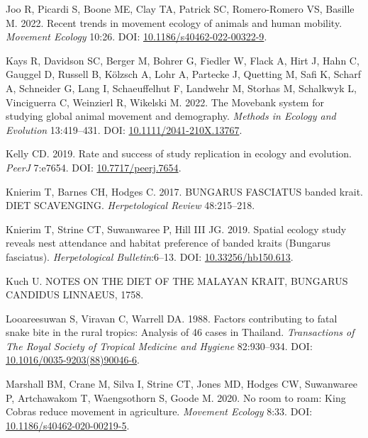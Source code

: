 \documentclass[10pt,a4paper]{article}
\newlength{\cslhangindent}
\newenvironment{CSLReferences}[2] %
 {\begin{list}{}{%
  \setlength{\itemindent}{0pt}
  \setlength{\leftmargin}{0pt}
  \setlength{\parsep}{0pt}
  \ifodd #1
   \setlength{\leftmargin}{\cslhangindent}
   \setlength{\itemindent}{-1\cslhangindent}
  \fi
  \setlength{\itemsep}{#2\baselineskip}}}
 {\end{list}}
\begin{document}
\begin{CSLReferences}{1}{0}
Joo R, Picardi S, Boone ME, Clay TA, Patrick SC, Romero-Romero VS, Basille M. 2022. Recent trends in movement ecology of animals and human mobility. \emph{Movement Ecology} 10:26. DOI: \href{https://doi.org/10.1186/s40462-022-00322-9}{10.1186/s40462-022-00322-9}.

Kays R, Davidson SC, Berger M, Bohrer G, Fiedler W, Flack A, Hirt J, Hahn C, Gauggel D, Russell B, Kölzsch A, Lohr A, Partecke J, Quetting M, Safi K, Scharf A, Schneider G, Lang I, Schaeuffelhut F, Landwehr M, Storhas M, Schalkwyk L, Vinciguerra C, Weinzierl R, Wikelski M. 2022. The {Movebank} system for studying global animal movement and demography. \emph{Methods in Ecology and Evolution} 13:419--431. DOI: \href{https://doi.org/10.1111/2041-210X.13767}{10.1111/2041-210X.13767}.

Kelly CD. 2019. Rate and success of study replication in ecology and evolution. \emph{PeerJ} 7:e7654. DOI: \href{https://doi.org/10.7717/peerj.7654}{10.7717/peerj.7654}.

Knierim T, Barnes CH, Hodges C. 2017. BUNGARUS FASCIATUS banded krait. DIET SCAVENGING. \emph{Herpetological Review} 48:215--218.

Knierim T, Strine CT, Suwanwaree P, Hill III JG. 2019. Spatial ecology study reveals nest attendance and habitat preference of banded kraits ({Bungarus} fasciatus). \emph{Herpetological Bulletin}:6--13. DOI: \href{https://doi.org/10.33256/hb150.613}{10.33256/hb150.613}.

Kuch U. {NOTES} {ON} {THE} {DIET} {OF} {THE} {MALAYAN} {KRAIT}, {BUNGARUS} {CANDIDUS} {LINNAEUS}, 1758.

Looareesuwan S, Viravan C, Warrell DA. 1988. Factors contributing to fatal snake bite in the rural tropics: Analysis of 46 cases in {Thailand}. \emph{Transactions of The Royal Society of Tropical Medicine and Hygiene} 82:930--934. DOI: \href{https://doi.org/10.1016/0035-9203(88)90046-6}{10.1016/0035-9203(88)90046-6}.

Marshall BM, Crane M, Silva I, Strine CT, Jones MD, Hodges CW, Suwanwaree P, Artchawakom T, Waengsothorn S, Goode M. 2020. No room to roam: {King} {Cobras} reduce movement in agriculture. \emph{Movement Ecology} 8:33. DOI: \href{https://doi.org/10.1186/s40462-020-00219-5}{10.1186/s40462-020-00219-5}.


\end{CSLReferences}
\end{document}
